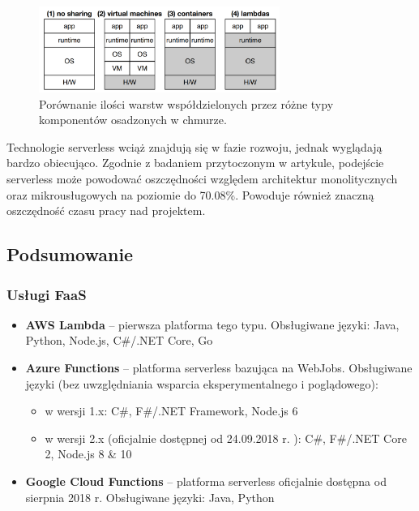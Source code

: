 \documentclass[12pt,a4paper,twoside,titlepage,openright]{book}
\begin{document}
\begin{figure}[h]
	\centering
			\includegraphics[width=0.7\textwidth]{serverlessSharing.png}
		\caption{Porównanie ilości warstw współdzielonych przez różne typy komponentów osadzonych w chmurze. \cite{openLambdaArticle}}
		\label{fig:serverlessSharing}
\end{figure}

Technologie serverless wciąż znajdują się w fazie rozwoju, jednak wyglądają bardzo obiecująco. Zgodnie z badaniem przytoczonym w artykule\cite{serverlessArticle}, podejście serverless może powodować oszczędności względem architektur monolitycznych oraz mikrousługowych na poziomie do 70.08\%. Powoduje również znaczną oszczędność czasu pracy nad projektem.\cite{serverlessMaddie}

\subsection*{Podsumowanie}

\subsubsection{Usługi FaaS}

\begin{itemize}
\item \textbf{AWS Lambda} -- pierwsza platforma tego typu. Obsługiwane języki: Java, Python, Node.js, C\#/.NET Core, Go
\item \textbf{Azure Functions} -- platforma serverless bazująca na WebJobs. Obsługiwane języki (bez uwzględniania wsparcia eksperymentalnego i poglądowego):
	\begin{itemize}
		\item w wersji 1.x: C\#, F\#/.NET Framework, Node.js 6
		\item w wersji 2.x (oficjalnie dostępnej od 24.09.2018 r. \cite{siteAzureFunctions2}): C\#, F\#/.NET Core 2, Node.js 8 \& 10
	\end{itemize}
\item \textbf{Google Cloud Functions} -- platforma serverless oficjalnie dostępna od sierpnia 2018 r. \cite{siteGoogleServerless} Obsługiwane języki: Java, Python
\end{itemize}
\end{document}
